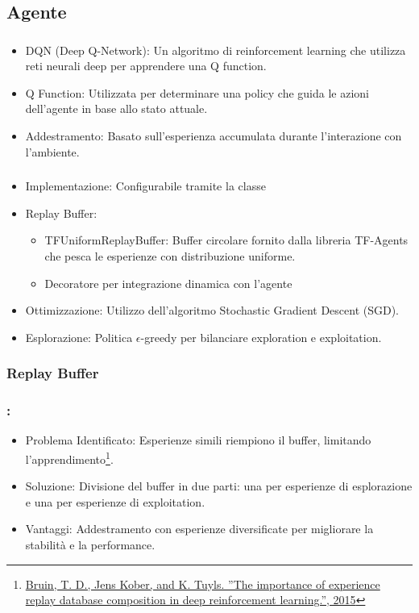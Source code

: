 \documentclass[compress]{beamer}
\begin{document}
\subsection{Agente}
\begin{frame}
    \frametitle{\subsecname}
    \begin{itemize}
        \item DQN (Deep Q-Network): Un algoritmo di reinforcement learning che utilizza reti neurali deep per apprendere una Q function.
        \item Q Function: Utilizzata per determinare una policy che guida le azioni dell'agente in base allo stato attuale.
        \item Addestramento: Basato sull'esperienza accumulata durante l'interazione con l'ambiente.
    \end{itemize}
\end{frame}
\begin{frame}
    \frametitle{\subsecname}
    \begin{itemize}
        \item Implementazione: Configurabile tramite la classe 
        \item Replay Buffer:
        \begin{itemize}
            \item TFUniformReplayBuffer: Buffer circolare fornito dalla libreria TF-Agents che pesca le esperienze con distribuzione uniforme.
            \item Decoratore per integrazione dinamica con l'agente
        \end{itemize}
        \item Ottimizzazione: Utilizzo dell'algoritmo Stochastic Gradient Descent (SGD).
        \item Esplorazione: Politica $\epsilon$-greedy per bilanciare exploration e exploitation.
        
    \end{itemize}
\end{frame}

\subsubsection{Replay Buffer}

\begin{frame}
    \frametitle{\subsecname: \subsubsecname}
    \begin{itemize}
        \item Problema Identificato: Esperienze simili riempiono il buffer, limitando l'apprendimento\footnote{\href{https://rll.berkeley.edu/deeprlworkshop/papers/database_composition.pdf}{ Bruin, T. D., Jens Kober, and K. Tuyls. ”The importance of experience replay database composition in deep reinforcement learning.”, 2015}}.
        \item Soluzione: Divisione del buffer in due parti: una per esperienze di esplorazione e una per esperienze di exploitation.
        \item Vantaggi: Addestramento con esperienze diversificate per migliorare la stabilità e la performance.
    \end{itemize}
\end{frame}
\end{document}
